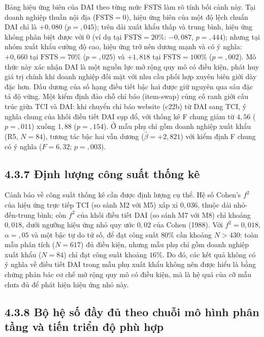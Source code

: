 \documentclass[
  a4paper,
  13pt]{extreport}
\begin{document}
Bảng hiệu ứng biên của DAI theo từng mức FSTS làm rõ tính bối cảnh này.
Tại doanh nghiệp thuần nội địa (\(\text{FSTS} = 0\)), hiệu ứng biên của
một độ lệch chuẩn DAI chỉ là \(+0{,}080\) (\(p = {,}045\)); trên dải
xuất khẩu thấp và trung bình, hiệu ứng không phân biệt được với 0 (ví dụ
tại \(\text{FSTS} = 20\%\): \(-0{,}087\), \(p = {,}444\)); nhưng tại
nhóm xuất khẩu cường độ cao, hiệu ứng trở nên dương mạnh và có ý nghĩa:
\(+0{,}660\) tại \(\text{FSTS} = 70\%\) (\(p = {,}025\)) và \(+1{,}818\)
tại \(\text{FSTS} = 100\%\) (\(p = {,}002\)). Mô thức này xác nhận DAI
là một nguồn lực mở rộng quy mô có điều kiện, phát huy giá trị chính khi
doanh nghiệp đối mặt với nhu cầu phối hợp xuyên biên giới dày đặc hơn.
Dấu dương của số hạng điều tiết bậc hai được giữ nguyên qua sáu đặc tả
độ vững. Một kiểm định đảo chỗ chỉ báo (item-swap) củng cố ranh giới cấu
trúc giữa TCI và DAI: khi chuyển chỉ báo website (c22b) từ DAI sang TCI,
ý nghĩa chung của khối điều tiết DAI sụp đổ, với thống kê F chung giảm
từ \(4{,}56\) (\(p = {,}011\)) xuống \(1{,}88\) (\(p = {,}154\)). Ở mẫu
phụ chỉ gồm doanh nghiệp xuất khẩu (R5, \(N = 84\)), tương tác bậc hai
vẫn dương (\(\hat{\beta} = +2{,}821\)) với kiểm định F chung có ý nghĩa
(\(F = 6{,}32\); \(p = {,}003\)).

\hypertarget{ux111ux1ecbnh-lux1b0ux1ee3ng-cuxf4ng-suux1ea5t-thux1ed1ng-kuxea}{%
\subsection{4.3.7 Định lượng công suất thống
kê}\label{ux111ux1ecbnh-lux1b0ux1ee3ng-cuxf4ng-suux1ea5t-thux1ed1ng-kuxea}}

Cảnh báo về công suất thống kê cần được định lượng cụ thể. Hệ số Cohen's
\(f^2\) của hiệu ứng trực tiếp TCI (so sánh M2 với M5) xấp xỉ
\(0{,}036\), thuộc dải nhỏ-đến-trung bình; còn \(f^2\) của khối điều
tiết DAI (so sánh M7 với M8) chỉ khoảng \(0{,}018\), dưới ngưỡng hiệu
ứng nhỏ quy ước \(0{,}02\) của Cohen (1988). Với \(f^2 = 0{,}018\),
\(\alpha = {,}05\) và một bậc tự do tử số, để đạt công suất \(80\%\) cần
khoảng \(N > 430\): toàn mẫu phân tích (\(N = 617\)) đủ điều kiện, nhưng
mẫu phụ chỉ gồm doanh nghiệp xuất khẩu (\(N = 84\)) chỉ đạt công suất
khoảng \(16\%\). Do đó, các kết quả không có ý nghĩa về điều tiết DAI
trong mẫu phụ xuất khẩu không nên được hiểu là bằng chứng phản bác cơ
chế mở rộng quy mô có điều kiện, mà là hệ quả của cỡ mẫu chưa đủ để phát
hiện hiệu ứng nhỏ này.

\hypertarget{bux1ed9-hux1ec7-sux1ed1-ux111ux1ea7y-ux111ux1ee7-theo-chuux1ed7i-muxf4-huxecnh-phuxe2n-tux1ea7ng-vuxe0-tiux1ebfn-triux1ec3n-ux111ux1ed9-phuxf9-hux1ee3p}{%
\subsection{4.3.8 Bộ hệ số đầy đủ theo chuỗi mô hình phân tầng và tiến
triển độ phù
hợp}\label{bux1ed9-hux1ec7-sux1ed1-ux111ux1ea7y-ux111ux1ee7-theo-chuux1ed7i-muxf4-huxecnh-phuxe2n-tux1ea7ng-vuxe0-tiux1ebfn-triux1ec3n-ux111ux1ed9-phuxf9-hux1ee3p}}
\end{document}
